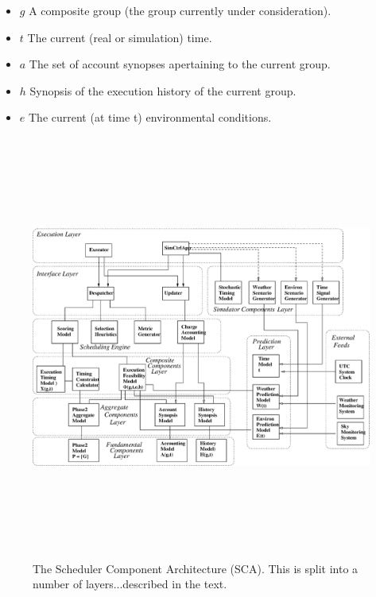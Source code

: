 \begin{itemize}
\item $g$ A composite group (the group currently under consideration).
\item $t$ The current (real or simulation) time.
\item $a$ The set of account synopses apertaining to the current group.
\item $h$ Synopsis of the execution history of the current group.
\item $e$ The current (at time t) environmental conditions.
\end{itemize}

\begin{landscape}
   \begin{figure}[htp]
   \begin{center}
   \includegraphics[height=14cm]{figures/sca.eps}
   \end{center}
   \label{fig:simframewrk} 
   \caption[Scheduler Component Architecture.] 
   {The Scheduler Component Architecture (SCA). This is split into a number of layers...described in the text.}
   \end{figure} 
\end{landscape}

